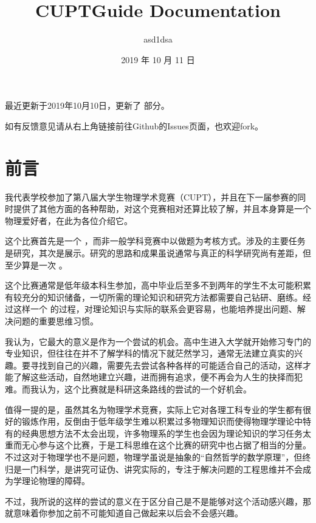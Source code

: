 \documentclass[a4paper,10pt,english]{sphinxmanual}
\title{CUPTGuide Documentation}
\date{2019 年 10 月 11 日}
\author{asd1dsa}
\begin{document}
\maketitle
\sphinxtableofcontents
{}\label{\detokenize{index::doc}}


最近更新于2019年10月10日，更新了  部分。

如有反馈意见请从右上角链接前往Github的Issues页面，也欢迎fork。


\chapter{前言}
\label{\detokenize{1. Preface:by-asd1dsa}}\label{\detokenize{1. Preface:id1}}\label{\detokenize{1. Preface::doc}}
我代表学校参加了第八届大学生物理学术竞赛（CUPT），并且在下一届参赛的同时提供了其他方面的各种帮助，对这个竞赛相对还算比较了解，并且本身算是一个物理爱好者，在此为各位介绍它。

这个比赛首先是一个  ，而非一般学科竞赛中以做题为考核方式。涉及的主要任务是研究，其次是展示。研究的思路和成果虽说通常与真正的科学研究尚有差距，但至少算是一次  。

这个比赛通常是低年级本科生参加，高中毕业后至多不到两年的学生不太可能积累有较充分的知识储备，一切所需的理论知识和研究方法都需要自己钻研、磨练。经过这样一个  的过程，对理论知识与实际的联系会更容易，也能培养提出问题、解决问题的重要思维习惯。

我认为，它最大的意义是作为一个尝试的机会。高中生进入大学就开始修习专门的专业知识，但往往在并不了解学科的情况下就茫然学习，通常无法建立真实的兴趣。要寻找到自己的兴趣，需要先去尝试各种各样的可能适合自己的活动，这样才能了解这些活动，自然地建立兴趣，进而拥有追求，便不再会为人生的抉择而犯难。而我认为，这个比赛就是科研这条路线的尝试的一个好机会。

值得一提的是，虽然其名为物理学术竞赛，实际上它对各理工科专业的学生都有很好的锻炼作用，反倒由于低年级学生难以积累过多物理知识而使得物理学理论中特有的经典思想方法不太会出现，许多物理系的学生也会因为理论知识的学习任务太重而无心参与这个比赛，于是工科思维在这个比赛的研究中也占据了相当的分量。不过这对于物理学也不是问题，物理学虽说是抽象的“自然哲学的数学原理”，但终归是一门科学，是讲究可证伪、讲究实际的，专注于解决问题的工程思维并不会成为学理论物理的障碍。

不过，我所说的这样的尝试的意义在于区分自己是不是能够对这个活动感兴趣，那就意味着你参加之前不可能知道自己做起来以后会不会感兴趣。
\end{document}
